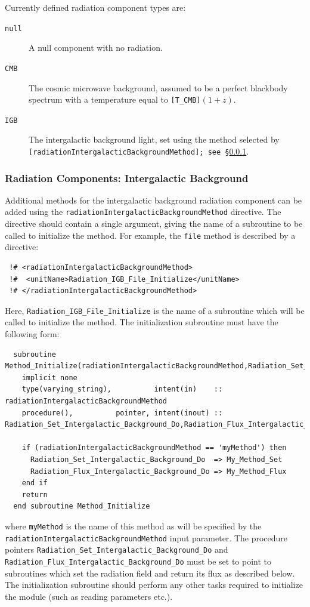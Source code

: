 Currently defined radiation component types are:
\begin{description}
 \item [{\tt null}] A null component with no radiation.
 \item [{\tt CMB}] The cosmic microwave background, assumed to be a perfect blackbody spectrum with a temperature equal to {\tt [T\_CMB]}$(1+z)$.
 \item [{\tt IGB}] The intergalactic background light, set using the method selected by {\tt [radiationIntergalacticBackgroundMethod]; see \S\ref{sec:radiationIGB}}.
\end{description}

\subsubsection{Radiation Components: Intergalactic Background}\label{sec:radiationIGB}

Additional methods for the intergalactic background radiation component can be added using the {\tt radiationIntergalacticBackgroundMethod} directive. The directive should contain a single argument, giving the name of a subroutine to be called to initialize the method. For example, the {\tt file} method is described by a directive:
\begin{verbatim}
 !# <radiationIntergalacticBackgroundMethod>
 !#  <unitName>Radiation_IGB_File_Initialize</unitName>
 !# </radiationIntergalacticBackgroundMethod>
\end{verbatim}
Here, {\tt Radiation\_IGB\_File\_Initialize} is the name of a subroutine which will be called to initialize the method. The initialization subroutine must have the following form:
\begin{verbatim}
  subroutine Method_Initialize(radiationIntergalacticBackgroundMethod,Radiation_Set_Intergalactic_Background_Do,Radiation_Flux_Intergalactic_Background_Do)
    implicit none
    type(varying_string),          intent(in)    :: radiationIntergalacticBackgroundMethod
    procedure(),          pointer, intent(inout) :: Radiation_Set_Intergalactic_Background_Do,Radiation_Flux_Intergalactic_Background_Do
    
    if (radiationIntergalacticBackgroundMethod == 'myMethod') then
      Radiation_Set_Intergalactic_Background_Do  => My_Method_Set
      Radiation_Flux_Intergalactic_Background_Do => My_Method_Flux
    end if
    return
  end subroutine Method_Initialize
\end{verbatim}
where {\tt myMethod} is the name of this method as will be specified by the {\tt radiationIntergalacticBackgroundMethod} input parameter. The procedure pointers {\tt Radiation\_Set\_Intergalactic\_Background\_Do} and {\tt Radiation\_Flux\_Intergalactic\_Background\_Do} must be set to point to subroutines which set the radiation field and return its flux as described below. The initialization subroutine should perform any other tasks required to initialize the module (such as reading parameters etc.).

